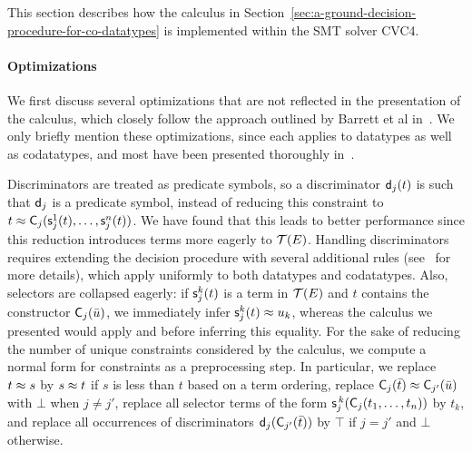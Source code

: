 This section describes how the calculus in Section~\ref{sec:a-ground-decision-procedure-for-co-datatypes} is implemented within the SMT solver CVC4.

\paragraph{Optimizations}
We first discuss several optimizations that are not reflected in the presentation of the calculus, which closely follow the approach outlined by Barrett et al in~\cite{}.
We only briefly mention these optimizations, since each applies to datatypes as well as codatatypes, and most have been presented thoroughly in~\cite{}.

Discriminators are treated as predicate symbols, so a discriminator $\textsf{d}_j( t )$ is such that $\textsf{d}_j$
is a predicate symbol, instead of reducing this constraint to $t \approx \textsf{C}_j( \textsf{s}^1_j( t ), \ldots, \textsf{s}^n_j( t ) )$.
We have found that this leads to better performance since this reduction introduces terms more eagerly to $\mathcal{T}(E)$.
Handling discriminators requires extending the decision procedure with several additional rules (see~\cite{} for more details), which apply uniformly to both datatypes and codatatypes.
Also, selectors are collapsed eagerly:
if $\textsf{s}^k_j( t )$ is a term in $\mathcal{T}(E)$ and $t$ contains the constructor
$\textsf{C}_j( \bar u )$, we immediately infer $\textsf{s}^k_j( t ) \approx u_k$, whereas the calculus we presented would apply  and  before inferring this equality.
For the sake of reducing the number of unique constraints considered by the calculus, we compute a normal form for constraints as a preprocessing step.
In particular, we
replace $t \approx s$ by $s \approx t$ if $s$ is less than $t$ based on a term ordering,
replace $\textsf{C}_j( \bar t ) \approx \textsf{C}_{j'}( \bar u )$ with $\bot$ when $j \neq j'$,
replace all selector terms of the form $\textsf{s}^{\,k}_j( \textsf{C}_j(t_1,\ldots,t_n) )$ by $t_k$,
and replace all occurrences of discriminators $\textsf{d}_j( \textsf{C}_{j'}( \bar t ) )$ by $\top$ if $j=j'$ and $\bot$ otherwise.

